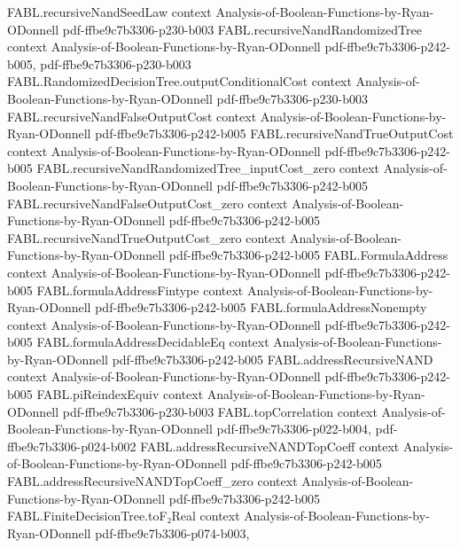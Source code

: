 \begin{theorem}
\proofstep
  {FABL.recursiveNandSeedLaw}
  {context}
  {Analysis-of-Boolean-Functions-by-Ryan-ODonnell}
  {pdf-ffbe9c7b3306-p230-b003}
\proofstep
  {FABL.recursiveNandRandomizedTree}
  {context}
  {Analysis-of-Boolean-Functions-by-Ryan-ODonnell}
  {pdf-ffbe9c7b3306-p242-b005,
    pdf-ffbe9c7b3306-p230-b003}
\proofstep
  {FABL.RandomizedDecisionTree.outputConditionalCost}
  {context}
  {Analysis-of-Boolean-Functions-by-Ryan-ODonnell}
  {pdf-ffbe9c7b3306-p230-b003}
\proofstep
  {FABL.recursiveNandFalseOutputCost}
  {context}
  {Analysis-of-Boolean-Functions-by-Ryan-ODonnell}
  {pdf-ffbe9c7b3306-p242-b005}
\proofstep
  {FABL.recursiveNandTrueOutputCost}
  {context}
  {Analysis-of-Boolean-Functions-by-Ryan-ODonnell}
  {pdf-ffbe9c7b3306-p242-b005}
\proofstep
  {FABL.recursiveNandRandomizedTree_inputCost_zero}
  {context}
  {Analysis-of-Boolean-Functions-by-Ryan-ODonnell}
  {pdf-ffbe9c7b3306-p242-b005}
\proofstep
  {FABL.recursiveNandFalseOutputCost_zero}
  {context}
  {Analysis-of-Boolean-Functions-by-Ryan-ODonnell}
  {pdf-ffbe9c7b3306-p242-b005}
\proofstep
  {FABL.recursiveNandTrueOutputCost_zero}
  {context}
  {Analysis-of-Boolean-Functions-by-Ryan-ODonnell}
  {pdf-ffbe9c7b3306-p242-b005}
\proofstep
  {FABL.FormulaAddress}
  {context}
  {Analysis-of-Boolean-Functions-by-Ryan-ODonnell}
  {pdf-ffbe9c7b3306-p242-b005}
\proofstep
  {FABL.formulaAddressFintype}
  {context}
  {Analysis-of-Boolean-Functions-by-Ryan-ODonnell}
  {pdf-ffbe9c7b3306-p242-b005}
\proofstep
  {FABL.formulaAddressNonempty}
  {context}
  {Analysis-of-Boolean-Functions-by-Ryan-ODonnell}
  {pdf-ffbe9c7b3306-p242-b005}
\proofstep
  {FABL.formulaAddressDecidableEq}
  {context}
  {Analysis-of-Boolean-Functions-by-Ryan-ODonnell}
  {pdf-ffbe9c7b3306-p242-b005}
\proofstep
  {FABL.addressRecursiveNAND}
  {context}
  {Analysis-of-Boolean-Functions-by-Ryan-ODonnell}
  {pdf-ffbe9c7b3306-p242-b005}
\proofstep
  {FABL.piReindexEquiv}
  {context}
  {Analysis-of-Boolean-Functions-by-Ryan-ODonnell}
  {pdf-ffbe9c7b3306-p230-b003}
\proofstep
  {FABL.topCorrelation}
  {context}
  {Analysis-of-Boolean-Functions-by-Ryan-ODonnell}
  {pdf-ffbe9c7b3306-p022-b004,
    pdf-ffbe9c7b3306-p024-b002}
\proofstep
  {FABL.addressRecursiveNANDTopCoeff}
  {context}
  {Analysis-of-Boolean-Functions-by-Ryan-ODonnell}
  {pdf-ffbe9c7b3306-p242-b005}
\proofstep
  {FABL.addressRecursiveNANDTopCoeff_zero}
  {context}
  {Analysis-of-Boolean-Functions-by-Ryan-ODonnell}
  {pdf-ffbe9c7b3306-p242-b005}
\proofstep
  {FABL.FiniteDecisionTree.toF₂Real}
  {context}
  {Analysis-of-Boolean-Functions-by-Ryan-ODonnell}
  {pdf-ffbe9c7b3306-p074-b003,
}
\end{theorem}
